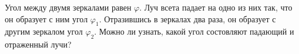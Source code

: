Угол между двумя зеркалами равен $\varphi$. Луч всета падает на одно из них так, что он образует с ним угол $\varphi_1$. Отразившись в зеркалах два раза, он образует с другим зеркалом угол $\varphi_2$. Можно ли узнать, какой угол состовляют падающий и отраженный лучи?
